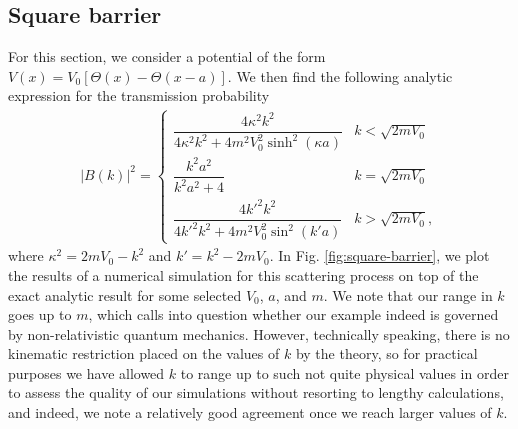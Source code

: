 \subsection{Square barrier}
\label{ssec:square-barrier}

For this section, we consider a potential of the form $V(x) = V_0 [ \Theta(x) - \Theta(x - a) ]$.
We then find the following analytic expression for the transmission probability
\begin{align}
\label{eq:square-barrier-Pt}
    |B(k)|^2 = 
    \begin{cases}
        \dfrac{4 \kappa^2 k^2}{4 \kappa^2 k^2 + 4 m^2 V_0^2 \sinh^2(\kappa a)} & k < \sqrt{2 m V_0} \\
        \dfrac{k^2 a^2}{k^2 a^2 + 4} & k = \sqrt{2 m V_0} \\
        \dfrac{4 k'^2 k^2}{4 k'^2 k^2 + 4 m^2 V_0^2 \sin^2(k' a)} & k > \sqrt{2 m V_0}
    ,\end{cases}
\end{align}
where $\kappa^2 = 2 m V_0 - k^2$ and $k' = k^2 - 2 m V_0$.
In Fig. \ref{fig:square-barrier}, we plot the results of a numerical simulation for this scattering process on top of the exact analytic result for some selected $V_0$, $a$, and $m$.
We note that our range in $k$ goes up to $m$, which calls into question whether our example indeed is governed by non-relativistic quantum mechanics.
However, technically speaking, there is no kinematic restriction placed on the values of $k$ by the theory, so for practical purposes we have allowed $k$ to range up to such not quite physical values in order to assess the quality of our simulations without resorting to lengthy calculations, and indeed, we note a relatively good agreement once we reach larger values of $k$.

